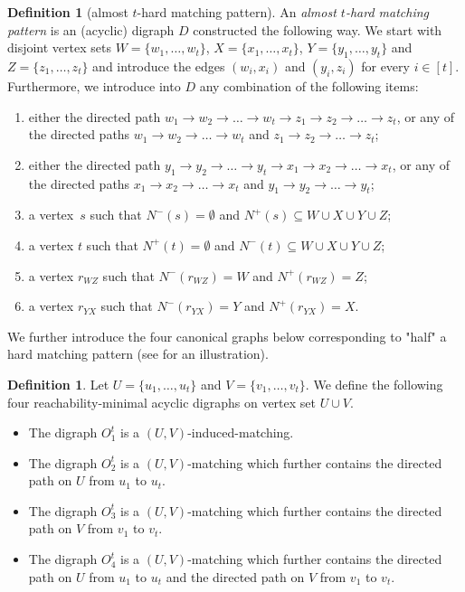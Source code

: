 \documentclass[a4paper,11pt]{article}
\theoremstyle{plain}
\newtheorem{identification rule}{Identification Rule}
\theoremstyle{definition}
\newtheorem{definition}[theorem]{Definition}
\theoremstyle{remark}
\begin{document}
\begin{definition}[almost $t$-hard matching pattern]
\label{def:almost}
An \emph{almost $t$-hard matching pattern} is an (acyclic) digraph $D$ constructed the following way. We start with disjoint vertex sets $W = \{w_1,\ldots,w_t\}$, $X = \{x_1,\ldots,x_t\}$, $Y = \{y_1,\ldots,y_t\}$ and $Z = \{z_1,\ldots,z_t\}$ and introduce the edges $(w_i,x_i)$ and $(y_i,z_i)$ for every $i\in[t]$.
Furthermore, we introduce into $D$ any combination of the following items:
\begin{enumerate}
\item[1.] either the directed path $w_1 \rightarrow w_2 \rightarrow \ldots \rightarrow w_t \rightarrow z_1 \rightarrow z_2 \rightarrow \ldots \rightarrow z_t$, or any of the directed paths $w_1 \rightarrow w_2 \rightarrow \ldots \rightarrow w_t$ and 
$z_1 \rightarrow z_2 \rightarrow \ldots \rightarrow z_t$;
\item[2.] either the directed path $y_1 \rightarrow y_2 \rightarrow \ldots \rightarrow y_t \rightarrow x_1 \rightarrow x_2 \rightarrow \ldots \rightarrow x_t$, or any of the directed paths $x_1 \rightarrow x_2 \rightarrow \ldots \rightarrow x_t$ and $y_1 \rightarrow y_2 \rightarrow \ldots \rightarrow y_t$;
\item[3.] a vertex~$s$ such that $N^-(s) = \emptyset$ and $N^+(s) \subseteq W \cup X \cup Y \cup Z$; 
\item[4.] a vertex $t$ such that $N^+(t) = \emptyset$ and $N^-(t) \subseteq W \cup X \cup Y \cup Z$; 
\item[5.] a vertex $r_{WZ}$ such that $N^-(r_{WZ}) = W$ and $N^+(r_{WZ}) = Z$;
\item[6.] a vertex $r_{YX}$ such that $N^-(r_{YX}) = Y$ and $N^+(r_{YX}) = X$.
\end{enumerate}
\end{definition}

We further introduce the four canonical graphs below corresponding to "half" a hard matching pattern (see  for an illustration).

\begin{definition}
\label{def:canonical}
Let $U = \{u_1,\ldots,u_t\}$ and $V = \{v_1,\ldots,v_t\}$. We define the following four reachability-minimal acyclic digraphs on vertex set $U \cup V$.
\begin{itemize}
\item The digraph $O_1^t$ is a $(U,V)$-induced-matching.
\item The digraph $O_2^t$ is a $(U,V)$-matching which further contains the directed path on $U$ from $u_1$ to $u_t$.
\item The digraph $O_3^t$ is a $(U,V)$-matching which further contains the directed path on $V$ from $v_1$ to $v_t$.
\item The digraph $O_4^t$  is a $(U,V)$-matching which further contains the directed path on $U$ from $u_1$ to $u_t$ and the directed path on $V$ from $v_1$ to $v_t$.
\end{itemize}
\end{definition}
\end{document}
